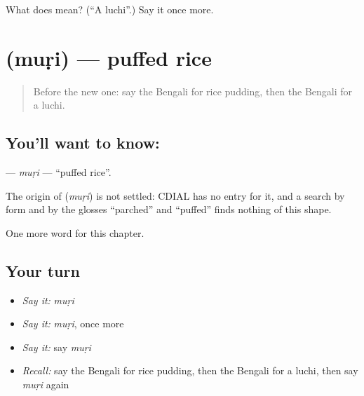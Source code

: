 \begin{tcolorbox}[breakable,colback=teal!4,colframe=teal!35!black,title={Before you move on}]
What does  mean? (\textquotedblleft{}A luchi\textquotedblright{}.) Say it once more.
\end{tcolorbox}
\section[\texorpdfstring{\bn{মুড়ি} (muṛi)}{মুড়ি (muṛi)}]{ (muṛi) — puffed rice}

\label{lesson:BN-C118-muri}



\begin{quote}
Before the new one: say the Bengali for rice pudding, then the Bengali for a luchi.
\end{quote}

\subsection*{You'll want to know: }
\textbf{} — \emph{muṛi} — \textquotedblleft{}puffed rice\textquotedblright{}.

\begin{cousinweb}
The origin of \textbf{} (\emph{muṛi}) is not settled: CDIAL has no entry for it, and a search by form and by the glosses \textquotedblleft{}parched\textquotedblright{} and \textquotedblleft{}puffed\textquotedblright{} finds nothing of this shape.
\end{cousinweb}

\begin{grammarlens}[title={What you've built}]
One more word for this chapter.
\end{grammarlens}

\subsection*{Your turn}
\begin{itemize}
\raggedright
  \item \emph{Say it:} \emph{muṛi}
  \item \emph{Say it:} \emph{muṛi}, once more
  \item \emph{Say it:} say \emph{muṛi}
  \item \emph{Recall:} say the Bengali for rice pudding, then the Bengali for a luchi, then say \emph{muṛi} again
\end{itemize}

